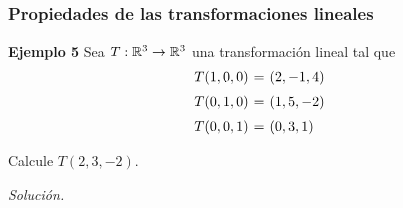 
\subsection{}

\begin{frame}\frametitle{Propiedades de las transformaciones lineales}


\begin{ej}{\textbf{Ejemplo 5}}
	\justifying
	Sea $T:\mathbb{R}^3\to \mathbb{R}^3$ una transformación lineal tal que 
	\[
		\begin{array}{r@{\hspace{0.6\tabcolsep}}c@{\hspace{0.6\tabcolsep}}l}
			T(1,0,0) & = & (2,-1,4) \\[2mm]
			T(0,1,0) & = & (1,5,-2) \\[2mm]
			T(0,0,1) & = & (0,3,1) 
		\end{array}
	\]
	
	\vspace{-1mm}
	Calcule $T(2,3,-2)$.
\end{ej}
\textit{Solución.}

\end{frame}


\subsection{}

